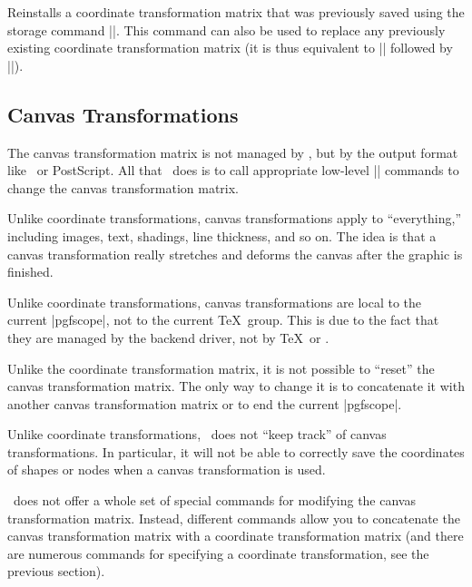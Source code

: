 \begin{command}{\pgfsettransformentries{}}
	Reinstalls a coordinate transformation matrix that was previously saved using the storage command |\pgfgettransformentries|. This command can also be used to replace any previously existing coordinate transformation matrix (it is thus equivalent to |\pgftransformreset| followed by |\pgftransformcm|).
\end{command}


\subsection{Canvas Transformations}

The canvas transformation matrix is not managed by \pgfname, but by
the output format like \pdf\ or PostScript. All that \pgfname\ does is
to call appropriate low-level |\pgfsys@| commands to change the canvas
transformation matrix.

Unlike coordinate transformations, canvas transformations apply to
``everything,'' including images, text, shadings, line thickness, and
so on. The idea is that a canvas transformation really stretches and
deforms the canvas after the graphic is finished.

Unlike coordinate transformations, canvas transformations are local to
the current |{pgfscope}|, not to the current \TeX\ group. This is due
to the fact that they are managed by the backend driver, not by \TeX\
or \pgfname.

Unlike the coordinate transformation matrix, it is not possible to
``reset'' the canvas transformation matrix. The only way to change it
is to concatenate it with another canvas transformation matrix or to
end the current |{pgfscope}|.

Unlike coordinate transformations, \pgfname\ does not ``keep track''
of canvas transformations. In particular, it will not be able to
correctly save the coordinates of shapes or nodes when a canvas
transformation is used.

\pgfname\ does not offer a whole set of special commands for modifying
the canvas transformation matrix. Instead, different commands allow
you to concatenate the canvas transformation matrix with a coordinate
transformation matrix (and there are numerous commands for specifying
a coordinate transformation, see the previous section).

